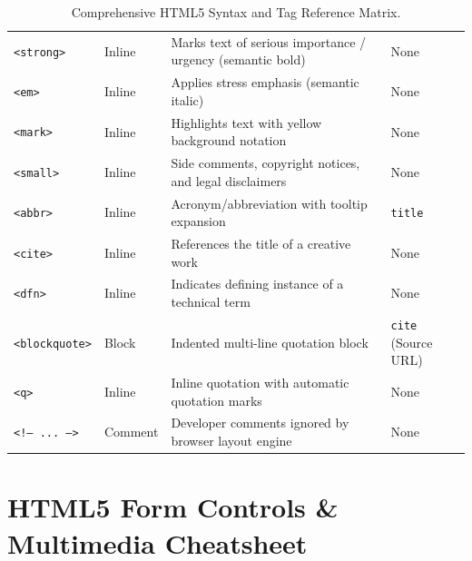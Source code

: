\begin{table}[htbp]
\begin{tabularx}{\linewidth}{ll>{\raggedright\arraybackslash}Xl}
\texttt{<strong>} & Inline & Marks text of serious importance / urgency (semantic bold) & None \\
\texttt{<em>} & Inline & Applies stress emphasis (semantic italic) & None \\
\texttt{<mark>} & Inline & Highlights text with yellow background notation & None \\
\texttt{<small>} & Inline & Side comments, copyright notices, and legal disclaimers & None \\
\texttt{<abbr>} & Inline & Acronym/abbreviation with tooltip expansion & \texttt{title} \\
\texttt{<cite>} & Inline & References the title of a creative work & None \\
\texttt{<dfn>} & Inline & Indicates defining instance of a technical term & None \\
\texttt{<blockquote>} & Block & Indented multi-line quotation block & \texttt{cite} (Source URL) \\
\texttt{<q>} & Inline & Inline quotation with automatic quotation marks & None \\
\texttt{<!-- ... -->} & Comment & Developer comments ignored by browser layout engine & None \\
\bottomrule
\end{tabularx}
\caption{Comprehensive HTML5 Syntax and Tag Reference Matrix.}
\label{tab:master-html-tags}
\end{table}

\section{HTML5 Form Controls \& Multimedia Cheatsheet}

